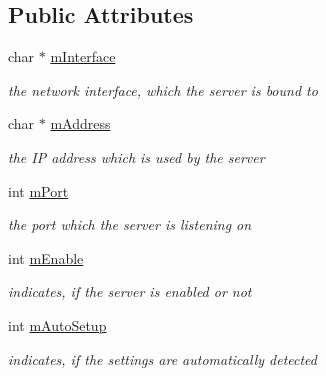 \subsection*{Public Attributes}
\begin{CompactItemize}
\item 
\hypertarget{classcUPnPConfig_dd0afbf876c2625acc52cfd8fd8b6a7c}{
char $\ast$ \hyperlink{classcUPnPConfig_dd0afbf876c2625acc52cfd8fd8b6a7c}{mInterface}}
\label{classcUPnPConfig_dd0afbf876c2625acc52cfd8fd8b6a7c}

\begin{CompactList}\small\item\em the network interface, which the server is bound to \item\end{CompactList}\item 
\hypertarget{classcUPnPConfig_0d7d7eb8d1ae9fffab39b39d1c9f10dd}{
char $\ast$ \hyperlink{classcUPnPConfig_0d7d7eb8d1ae9fffab39b39d1c9f10dd}{mAddress}}
\label{classcUPnPConfig_0d7d7eb8d1ae9fffab39b39d1c9f10dd}

\begin{CompactList}\small\item\em the IP address which is used by the server \item\end{CompactList}\item 
\hypertarget{classcUPnPConfig_93224ed337b1f74525a68c5159532cb3}{
int \hyperlink{classcUPnPConfig_93224ed337b1f74525a68c5159532cb3}{mPort}}
\label{classcUPnPConfig_93224ed337b1f74525a68c5159532cb3}

\begin{CompactList}\small\item\em the port which the server is listening on \item\end{CompactList}\item 
\hypertarget{classcUPnPConfig_6861c1183545e44a7d33e17440f4cd8c}{
int \hyperlink{classcUPnPConfig_6861c1183545e44a7d33e17440f4cd8c}{mEnable}}
\label{classcUPnPConfig_6861c1183545e44a7d33e17440f4cd8c}

\begin{CompactList}\small\item\em indicates, if the server is enabled or not \item\end{CompactList}\item 
\hypertarget{classcUPnPConfig_da3ca113e9f1946fd1c09ebdcdcde0af}{
int \hyperlink{classcUPnPConfig_da3ca113e9f1946fd1c09ebdcdcde0af}{mAutoSetup}}
\label{classcUPnPConfig_da3ca113e9f1946fd1c09ebdcdcde0af}

\begin{CompactList}\small\item\em indicates, if the settings are automatically detected \item\end{CompactList}\end{CompactItemize}


